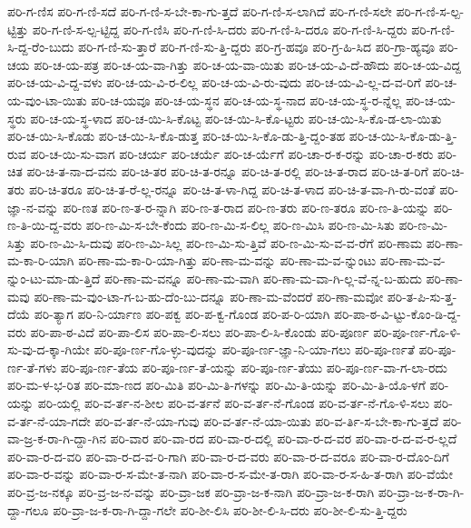 {ಪರಿ-ಗ-ಣಿಸ
ಪರಿ-ಗ-ಣಿ-ಸದೆ
ಪರಿ-ಗ-ಣಿ-ಸ-ಬೇ-ಕಾ-ಗು-ತ್ತದೆ
ಪರಿ-ಗ-ಣಿ-ಸ-ಲಾಗಿದೆ
ಪರಿ-ಗ-ಣಿ-ಸಲೇ
ಪರಿ-ಗ-ಣಿ-ಸ-ಲ್ಪ-ಟ್ಟಿತ್ತು
ಪರಿ-ಗ-ಣಿ-ಸ-ಲ್ಪ-ಟ್ಟಿದ್ದ
ಪರಿ-ಗ-ಣಿಸಿ
ಪರಿ-ಗ-ಣಿ-ಸಿ-ದರು
ಪರಿ-ಗ-ಣಿ-ಸಿ-ದರೂ
ಪರಿ-ಗ-ಣಿ-ಸಿ-ದ್ದರು
ಪರಿ-ಗ-ಣಿ-ಸಿ-ದ್ದ-ರೆಂ-ಬುದು
ಪರಿ-ಗ-ಣಿ-ಸು-ತ್ತಾರೆ
ಪರಿ-ಗ-ಣಿ-ಸು-ತ್ತಿ-ದ್ದರು
ಪರಿ-ಗ್ರ-ಹವೂ
ಪರಿ-ಗ್ರ-ಹಿ-ಸಿದ
ಪರಿ-ಗ್ರಾ-ಹ್ಯವೂ
ಪರಿ-ಚಯ
ಪರಿ-ಚ-ಯ-ಪತ್ರ
ಪರಿ-ಚ-ಯ-ವಾ-ಗಿತ್ತು
ಪರಿ-ಚ-ಯ-ವಾ-ಯಿತು
ಪರಿ-ಚ-ಯ-ವಿ-ದೆ-ಹೌದು
ಪರಿ-ಚ-ಯ-ವಿದ್ದ
ಪರಿ-ಚ-ಯ-ವಿ-ದ್ದ-ವಳು
ಪರಿ-ಚ-ಯ-ವಿ-ರ-ಲಿಲ್ಲ
ಪರಿ-ಚ-ಯ-ವಿ-ರು-ವುದು
ಪರಿ-ಚ-ಯ-ವಿ-ಲ್ಲ-ದ-ವ-ರಿಗೆ
ಪರಿ-ಚ-ಯ-ವುಂ-ಟಾ-ಯಿತು
ಪರಿ-ಚ-ಯವೂ
ಪರಿ-ಚ-ಯ-ಸ್ಥನ
ಪರಿ-ಚ-ಯ-ಸ್ಥ-ನಾದ
ಪರಿ-ಚ-ಯ-ಸ್ಥ-ರ-ನ್ನೆಲ್ಲ
ಪರಿ-ಚ-ಯ-ಸ್ಥರು
ಪರಿ-ಚ-ಯ-ಸ್ಥ-ಳಾದ
ಪರಿ-ಚ-ಯಿ-ಸಿ-ಕೊಟ್ಟ
ಪರಿ-ಚ-ಯಿ-ಸಿ-ಕೊ-ಟ್ಟರು
ಪರಿ-ಚ-ಯಿ-ಸಿ-ಕೊ-ಡ-ಲಾ-ಯಿತು
ಪರಿ-ಚ-ಯಿ-ಸಿ-ಕೊಡು
ಪರಿ-ಚ-ಯಿ-ಸಿ-ಕೊ-ಡುತ್ತ
ಪರಿ-ಚ-ಯಿ-ಸಿ-ಕೊ-ಡು-ತ್ತಿ-ದ್ದಂ-ತಹ
ಪರಿ-ಚ-ಯಿ-ಸಿ-ಕೊ-ಡು-ತ್ತಿ-ರುವ
ಪರಿ-ಚ-ಯಿ-ಸು-ವಾಗ
ಪರಿ-ಚರ್ಯ
ಪರಿ-ಚರ್ಯೆ
ಪರಿ-ಚ-ರ್ಯೆಗೆ
ಪರಿ-ಚಾ-ರ-ಕ-ರನ್ನು
ಪರಿ-ಚಾ-ರ-ಕರು
ಪರಿ-ಚಿತ
ಪರಿ-ಚಿ-ತ-ನಾ-ದ-ವನು
ಪರಿ-ಚಿ-ತರ
ಪರಿ-ಚಿ-ತ-ರನ್ನೂ
ಪರಿ-ಚಿ-ತ-ರಲ್ಲಿ
ಪರಿ-ಚಿ-ತ-ರಾದ
ಪರಿ-ಚಿ-ತ-ರಿಗೆ
ಪರಿ-ಚಿ-ತರು
ಪರಿ-ಚಿ-ತರೂ
ಪರಿ-ಚಿ-ತ-ರೆ-ಲ್ಲ-ರನ್ನೂ
ಪರಿ-ಚಿ-ತ-ಳಾ-ಗಿದ್ದ
ಪರಿ-ಚಿ-ತ-ಳಾದ
ಪರಿ-ಚಿ-ತ-ವಾ-ಗಿ-ರು-ವಂತೆ
ಪರಿ-ಜ್ಞಾ-ನ-ವನ್ನು
ಪರಿ-ಣತ
ಪರಿ-ಣ-ತ-ರ-ನ್ನಾಗಿ
ಪರಿ-ಣ-ತ-ರಾದ
ಪರಿ-ಣ-ತರು
ಪರಿ-ಣ-ತರೂ
ಪರಿ-ಣ-ತಿ-ಯನ್ನು
ಪರಿ-ಣ-ತಿ-ಯಿ-ದ್ದ-ವರು
ಪರಿ-ಣ-ಮಿ-ಸ-ಬೇ-ಕೆಂದು
ಪರಿ-ಣ-ಮಿ-ಸ-ಲಿಲ್ಲ
ಪರಿ-ಣ-ಮಿಸಿ
ಪರಿ-ಣ-ಮಿ-ಸಿತು
ಪರಿ-ಣ-ಮಿ-ಸಿತ್ತು
ಪರಿ-ಣ-ಮಿ-ಸಿ-ದುವು
ಪರಿ-ಣ-ಮಿ-ಸಿಲ್ಲ
ಪರಿ-ಣ-ಮಿ-ಸು-ತ್ತಿವೆ
ಪರಿ-ಣ-ಮಿ-ಸು-ವ-ವ-ರೆಗೆ
ಪರಿ-ಣಾಮ
ಪರಿ-ಣಾ-ಮ-ಕಾ-ರಿ-ಯಾಗಿ
ಪರಿ-ಣಾ-ಮ-ಕಾ-ರಿ-ಯಾ-ಗಿತ್ತು
ಪರಿ-ಣಾ-ಮ-ವನ್ನು
ಪರಿ-ಣಾ-ಮ-ವ-ನ್ನುಂಟು
ಪರಿ-ಣಾ-ಮ-ವ-ನ್ನುಂ-ಟು-ಮಾ-ಡು-ತ್ತಿದೆ
ಪರಿ-ಣಾ-ಮ-ವನ್ನೂ
ಪರಿ-ಣಾ-ಮ-ವಾಗಿ
ಪರಿ-ಣಾ-ಮ-ವಾ-ಗಿ-ಲ್ಲ-ವೆ-ನ್ನ-ಬ-ಹುದು
ಪರಿ-ಣಾ-ಮವು
ಪರಿ-ಣಾ-ಮ-ವುಂ-ಟಾ-ಗ-ಬ-ಹು-ದೆಂ-ಬು-ದನ್ನೂ
ಪರಿ-ಣಾ-ಮ-ವೆಂದರೆ
ಪರಿ-ಣಾ-ಮವೋ
ಪರಿ-ತ-ಪಿ-ಸು-ತ್ತ-ದೆಯೆ
ಪರಿ-ತ್ಯಾಗ
ಪರಿ-ನಿ-ರ್ಯಾಣ
ಪರಿ-ಪಕ್ವ
ಪರಿ-ಪ-ಕ್ವ-ಗೊಂಡ
ಪರಿ-ಪ-ರಿ-ಯಾಗಿ
ಪರಿ-ಪಾ-ಠ-ವಿ-ಟ್ಟು-ಕೊಂ-ಡಿ-ದ್ದ-ವರು
ಪರಿ-ಪಾ-ಠ-ವಿದೆ
ಪರಿ-ಪಾ-ಲಿಸ
ಪರಿ-ಪಾ-ಲಿ-ಸಲು
ಪರಿ-ಪಾ-ಲಿ-ಸಿ-ಕೊಂಡು
ಪರಿ-ಪೂರ್ಣ
ಪರಿ-ಪೂ-ರ್ಣ-ಗೊ-ಳಿ-ಸು-ವು-ದ-ಕ್ಕಾ-ಗಿಯೇ
ಪರಿ-ಪೂ-ರ್ಣ-ಗೊ-ಳ್ಳು-ವುದನ್ನು
ಪರಿ-ಪೂ-ರ್ಣ-ಜ್ಞಾ-ನಿ-ಯಾ-ಗಲು
ಪರಿ-ಪೂ-ರ್ಣತೆ
ಪರಿ-ಪೂ-ರ್ಣ-ತೆ-ಗಳು
ಪರಿ-ಪೂ-ರ್ಣ-ತೆಯ
ಪರಿ-ಪೂ-ರ್ಣ-ತೆ-ಯನ್ನು
ಪರಿ-ಪೂ-ರ್ಣ-ತೆಯು
ಪರಿ-ಪೂ-ರ್ಣ-ವಾ-ಗ-ಲಾ-ರದು
ಪರಿ-ಮ-ಳ-ಭ-ರಿತ
ಪರಿ-ಮಾ-ಣದ
ಪರಿ-ಮಿತಿ
ಪರಿ-ಮಿ-ತಿ-ಗಳನ್ನು
ಪರಿ-ಮಿ-ತಿ-ಯನ್ನು
ಪರಿ-ಮಿ-ತಿ-ಯೊ-ಳಗೆ
ಪರಿ-ಯನ್ನು
ಪರಿ-ಯಲ್ಲಿ
ಪರಿ-ವ-ರ್ತ-ನ-ಶೀಲ
ಪರಿ-ವ-ರ್ತನೆ
ಪರಿ-ವ-ರ್ತ-ನೆ-ಗೊಂಡ
ಪರಿ-ವ-ರ್ತ-ನೆ-ಗೊ-ಳಿ-ಸಲು
ಪರಿ-ವ-ರ್ತ-ನೆ-ಯಾ-ಗದೇ
ಪರಿ-ವ-ರ್ತ-ನೆ-ಯಾ-ಗುವು
ಪರಿ-ವ-ರ್ತ-ನೆ-ಯಾ-ಯಿತು
ಪರಿ-ವ-ರ್ತಿ-ಸ-ಬೇ-ಕಾ-ಗು-ತ್ತದೆ
ಪರಿ-ವಾ-ಜ್ರ-ಕ-ರಾ-ಗಿ-ದ್ದಾ-ಗಿನ
ಪರಿ-ವಾರ
ಪರಿ-ವಾ-ರದ
ಪರಿ-ವಾ-ರ-ದಲ್ಲಿ
ಪರಿ-ವಾ-ರ-ದ-ವರ
ಪರಿ-ವಾ-ರ-ದ-ವ-ರ-ಲ್ಲದೆ
ಪರಿ-ವಾ-ರ-ದ-ವರಿ
ಪರಿ-ವಾ-ರ-ದ-ವ-ರಿ-ಗಾಗಿ
ಪರಿ-ವಾ-ರ-ದ-ವರು
ಪರಿ-ವಾ-ರ-ದ-ವರೂ
ಪರಿ-ವಾ-ರ-ದೊಂ-ದಿಗೆ
ಪರಿ-ವಾ-ರ-ವನ್ನು
ಪರಿ-ವಾ-ರ-ಸ-ಮೇ-ತ-ನಾಗಿ
ಪರಿ-ವಾ-ರ-ಸ-ಮೇ-ತ-ರಾಗಿ
ಪರಿ-ವಾ-ರ-ಸ-ಹಿ-ತ-ರಾಗಿ
ಪರಿ-ವೆಯೇ
ಪರಿ-ವ್ರ-ಜ-ನಕ್ಕೂ
ಪರಿ-ವ್ರ-ಜ-ನ-ವನ್ನು
ಪರಿ-ವ್ರಾ-ಜಕ
ಪರಿ-ವ್ರಾ-ಜ-ಕ-ನಾಗಿ
ಪರಿ-ವ್ರಾ-ಜ-ಕ-ರಾಗಿ
ಪರಿ-ವ್ರಾ-ಜ-ಕ-ರಾ-ಗಿ-ದ್ದಾ-ಗಲೂ
ಪರಿ-ವ್ರಾ-ಜ-ಕ-ರಾ-ಗಿ-ದ್ದಾ-ಗಲೇ
ಪರಿ-ಶೀ-ಲಿಸಿ
ಪರಿ-ಶೀ-ಲಿ-ಸಿ-ದರು
ಪರಿ-ಶೀ-ಲಿ-ಸು-ತ್ತಿ-ದ್ದರು
}
